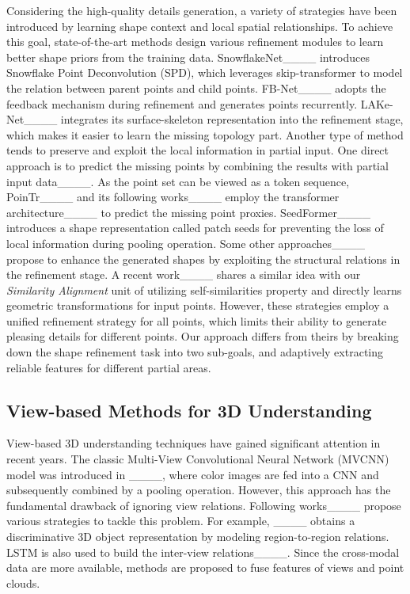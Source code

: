 Considering the high-quality details generation, a variety of strategies have been introduced by learning shape context and local spatial relationships. 
To achieve this goal, state-of-the-art methods design various refinement modules to learn better shape priors from the training data.
SnowflakeNet____ introduces Snowflake Point Deconvolution (SPD), which leverages skip-transformer to model the relation between parent points and child points. 
FB-Net____ adopts the feedback mechanism during refinement and generates points recurrently.
LAKe-Net____ integrates its surface-skeleton representation into the refinement stage, which makes it easier to learn the missing topology part.
Another type of method tends to preserve and exploit the local information in partial input.
One direct approach is to predict the missing points by combining the results with partial input data____. As the point set can be viewed as a token sequence, PoinTr____ and its following works____ employ the transformer architecture____ to predict the missing point proxies.
SeedFormer____ introduces a shape representation called patch seeds for preventing the loss of local information during pooling operation. 
Some other approaches____ propose to enhance the generated shapes by exploiting the structural relations in the refinement stage.
A recent work____ shares a similar idea with our \emph{Similarity Alignment} unit of utilizing self-similarities property and directly learns geometric transformations for input points.
However, these strategies employ a unified refinement strategy for all points, which limits their ability to generate pleasing details for different points.
Our approach differs from theirs by breaking down the shape refinement task into two sub-goals, and adaptively extracting reliable features for different partial areas.

\subsection{View-based Methods for 3D Understanding}
View-based 3D understanding techniques have gained significant attention in recent years.
The classic Multi-View Convolutional Neural Network (MVCNN) model was introduced in ____, where color images are fed into a CNN and subsequently combined by a pooling operation. However, this approach has the fundamental drawback of ignoring view relations.
Following works____ propose various strategies to tackle this problem. For example,
____ obtains a discriminative 3D object representation by modeling region-to-region relations.
LSTM is also used to build the inter-view relations____.
Since the cross-modal data are more available, methods are proposed to fuse features of views and point clouds.

